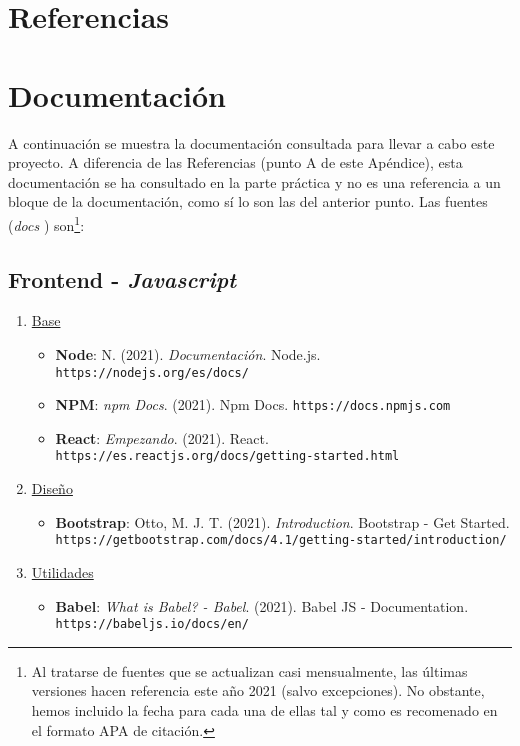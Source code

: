 \documentclass[../ei103948-project-documentation.tex]{subfiles}
\begin{document}
\appendix

\newpage
\section{Referencias}	
\printbibliography[heading=none]

\newpage
\section{Documentación}
A continuación se muestra la documentación consultada para llevar a cabo este proyecto. A diferencia de las Referencias (punto A de este Apéndice), esta documentación se ha consultado en la parte práctica y no es una referencia a un bloque de la documentación, como sí lo son las del anterior punto. Las fuentes (\textit{docs} ) son\footnote{Al tratarse de fuentes que se actualizan casi mensualmente, las últimas versiones hacen referencia este año 2021 (salvo excepciones). No obstante, hemos incluido la fecha para cada una de ellas tal y como es recomenado en el formato APA de citación.}:

    \subsection{Frontend - \textit{Javascript}}
        \begin{enumerate}
            \item \underline{Base}
                \begin{itemize}
                    \item [\faIcon{book}] \textbf{Node}: N. (2021). \textit{Documentación}. Node.js. \texttt{https://nodejs.org/es/docs/}
                    \item [\faIcon{book}] \textbf{NPM}: \textit{npm Docs}. (2021). Npm Docs. \texttt{https://docs.npmjs.com}
                    \item [\faIcon{book}] \textbf{React}: \textit{Empezando}. (2021). React. \texttt{https://es.reactjs.org/docs/getting-started.html}
                \end{itemize}
            \item \underline{Diseño}
                \begin{itemize}
                    \item [\faIcon{book}] \textbf{Bootstrap}: Otto, M. J. T. (2021). \textit{Introduction}. Bootstrap - Get Started. \texttt{https://getbootstrap.com/docs/4.1/getting-started/introduction/}
                \end{itemize}
            \item \underline{Utilidades}
                \begin{itemize}
                    \item [\faIcon{book}] \textbf{Babel}: \textit{What is Babel? - Babel}. (2021). Babel JS - Documentation. \texttt{https://babeljs.io/docs/en/}
                \end{itemize}
        \end{enumerate}
\end{document}
